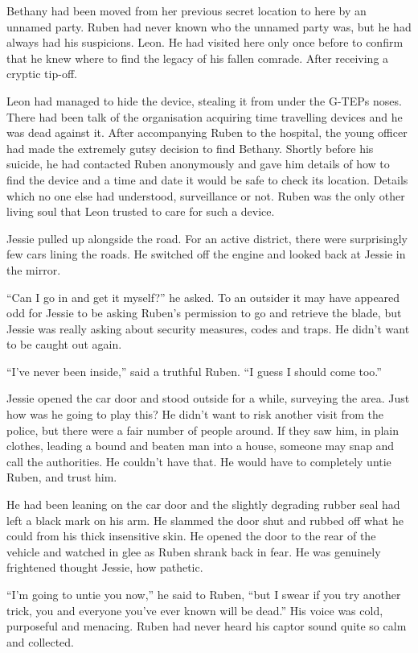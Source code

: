 Bethany had been moved from her previous secret location to here by an unnamed party.  Ruben had never known who the unnamed party was, but he had always had his suspicions.  Leon.  He had visited here only once before to confirm that he knew where to find the legacy of his fallen comrade.  After receiving a cryptic tip-off.  

Leon had managed to hide the device, stealing it from under the G-TEPs noses.  There had been talk of the organisation acquiring time travelling devices and he was dead against it.  After accompanying Ruben to the hospital, the young officer had made the extremely gutsy decision to find Bethany.  Shortly before his suicide, he had contacted Ruben anonymously and gave him details of how to find the device and a time and date it would be safe to check its location.  Details which no one else had understood, surveillance or not.  Ruben was the only other living soul that Leon trusted to care for such a device.

Jessie pulled up alongside the road.  For an active district, there were surprisingly few cars lining the roads.  He switched off the engine and looked back at Jessie in the mirror.  

``Can I go in and get it myself?'' he asked.  To an outsider it may have appeared odd for Jessie to be asking Ruben's permission to go and retrieve the blade, but Jessie was really asking about security measures, codes and traps.  He didn't want to be caught out again.

``I've never been inside,'' said a truthful Ruben.  ``I guess I should come too.''

Jessie opened the car door and stood outside for a while, surveying the area.  Just how was he going to play this?  He didn't want to risk another visit from the police, but there were a fair number of people around.  If they saw him, in plain clothes, leading a bound and beaten man into a house, someone may snap and call the authorities.  He couldn't have that.  He would have to completely untie Ruben, and trust him.

He had been leaning on the car door and the slightly degrading rubber seal had left a black mark on his arm.  He slammed the door shut and rubbed off what he could from his thick insensitive skin.  He opened the door to the rear of the vehicle and watched in glee as Ruben shrank back in fear.  He was genuinely frightened thought Jessie,  how pathetic.

``I'm going to untie you now,'' he said to Ruben, ``but I swear if you try another trick, you and everyone you've ever known will be dead.''  His voice was cold, purposeful and menacing.  Ruben had never heard his captor sound quite so calm and collected. 

